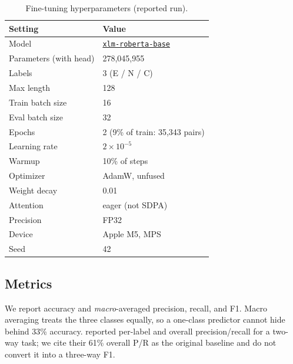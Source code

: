 \documentclass[conference]{IEEEtran}
\newcommand{\xlmr}{\href{https://huggingface.co/FacebookAI/xlm-roberta-base}{\texttt{xlm-roberta-base}}}
\begin{document}
\begin{table}[!t]
\centering
\caption{Fine-tuning hyperparameters (reported run).}
\label{tab:hp}
\begin{tabular}{@{}ll@{}}
\toprule
\textbf{Setting} & \textbf{Value} \\
\midrule
Model & \xlmr{} \\
Parameters (with head) & 278{,}045{,}955 \\
Labels & 3 (E / N / C) \\
Max length & 128 \\
Train batch size & 16 \\
Eval batch size & 32 \\
Epochs & 2 (9\% of train: 35{,}343 pairs) \\
Learning rate & $2\times 10^{-5}$ \\
Warmup & 10\% of steps \\
Optimizer & AdamW, unfused \\
Weight decay & 0.01 \\
Attention & eager (not SDPA) \\
Precision & FP32 \\
Device & Apple M5, MPS \\
Seed & 42 \\
\bottomrule
\end{tabular}
\end{table}

\subsection{Metrics}
We report accuracy and \emph{macro}-averaged precision, recall, and F1. Macro averaging treats the three classes equally, so a one-class predictor cannot hide behind 33\% accuracy. \citet{khader2016textual} reported per-label and overall precision/recall for a two-way task; we cite their 61\% overall P/R as the original baseline and do not convert it into a three-way F1.
\end{document}
